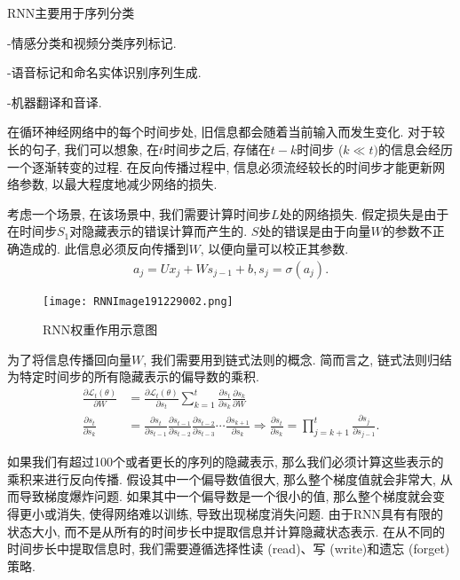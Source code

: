 RNN主要用于序列分类

-情感分类和视频分类序列标记.

-语音标记和命名实体识别序列生成.

-机器翻译和音译.

在循环神经网络中的每个时间步处, 旧信息都会随着当前输入而发生变化.
对于较长的句子, 我们可以想象, 在$t$时间步之后, 存储在$t-k$时间步 ($k\ll t)$的信息会经历一个逐渐转变的过程.
在反向传播过程中, 信息必须流经较长的时间步才能更新网络参数, 以最大程度地减少网络的损失.

考虑一个场景, 在该场景中, 我们需要计算时间步$L$处的网络损失.
假定损失是由于在时间步$S_1$对隐藏表示的错误计算而产生的. $S$处的错误是由于向量$W$的参数不正确造成的. 此信息必须反向传播到$W$, 以便向量可以校正其参数.
\begin{align}
    a_{j}=U x_{j}+W s_{j-1}+b, s_{j}=\sigma\left (a_{j}\right).
\end{align}
\begin{figure}[H]
    \centering
    \texttt{[image: RNNImage191229002.png]}
    \caption{RNN权重作用示意图}
    \label{RNNImage191229002}\vspace{-0.4cm}
\end{figure}

为了将信息传播回向量$W$, 我们需要用到链式法则的概念.
简而言之, 链式法则归结为特定时间步的所有隐藏表示的偏导数的乘积.
\begin{align}
    \frac{\partial \mathscr{L}_{t} (\theta)}{\partial W}&=\frac{\partial \mathscr{L}_{t} (\theta)}{\partial s_{t}} \sum_{k=1}^{t} \frac{\partial s_{t}}{\partial s_{k}} \frac{\partial s_{k}}{\partial W}\\
    \frac{\partial s_{t}}{\partial s_{k}}               &=\frac{\partial s_{t}}{\partial s_{t-1}} \frac{\partial s_{t-1}}{\partial s_{t-2}} \frac{\partial s_{t-2}}{\partial s_{t-3}} \cdots \frac{\partial
                                                               s_{k+1}}{\partial s_{k}} \Rightarrow \frac{\partial s_{t}}{\partial s_{k}}=\prod_{j=k+1}^{t} \frac{\partial s_{j}}{\partial s_{j-1}}.
\end{align}

如果我们有超过100个或者更长的序列的隐藏表示, 那么我们必须计算这些表示的乘积来进行反向传播.
假设其中一个偏导数值很大, 那么整个梯度值就会非常大, 从而导致梯度爆炸问题.
如果其中一个偏导数是一个很小的值, 那么整个梯度就会变得更小或消失, 使得网络难以训练, 导致出现梯度消失问题.
由于RNN具有有限的状态大小, 而不是从所有的时间步长中提取信息并计算隐藏状态表示.
在从不同的时间步长中提取信息时, 我们需要遵循选择性读 (read)、写 (write)和遗忘 (forget)策略.


